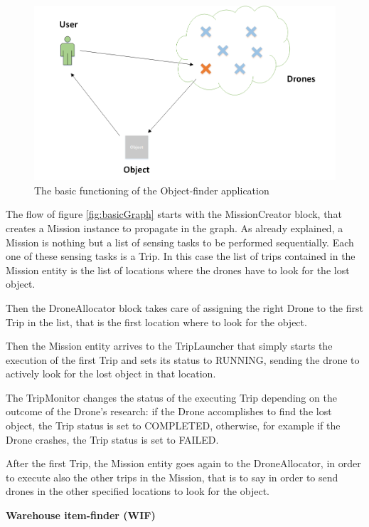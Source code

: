 \begin{figure}[H]
  \centering
  \includegraphics[width=\linewidth]{pictures/OF.png}
  \caption{The basic functioning of the Object-finder application}
  \label{fig:OF}
\end{figure}


The flow of figure \ref{fig:basicGraph} starts with the MissionCreator block, that creates a Mission instance to propagate in the graph.
As already explained, a Mission is nothing but a list of sensing tasks to be performed sequentially.
Each one of these sensing tasks is a Trip.
In this case the list of trips contained in the Mission entity is the list of locations where the drones have to look for the lost object.

Then the DroneAllocator block takes care of assigning the right Drone to the first Trip in the list, that is the first location where to look for the object.

Then the Mission entity arrives to the TripLauncher that simply starts the execution of the first Trip and sets its status to RUNNING, sending the drone to actively look for the lost object in that location.

The TripMonitor changes the status of the executing Trip depending on the outcome of the Drone's research:
if the Drone accomplishes to find the lost object, the Trip status is set to COMPLETED, otherwise, for example if the Drone crashes, the Trip status is set to FAILED.

After the first Trip, the Mission entity goes again to the DroneAllocator, in order to execute also the other trips in the Mission, that is to say in order to send drones in the other specified locations to look for the object.


\newpage

\textbf{Warehouse item-finder (WIF)}
\\

